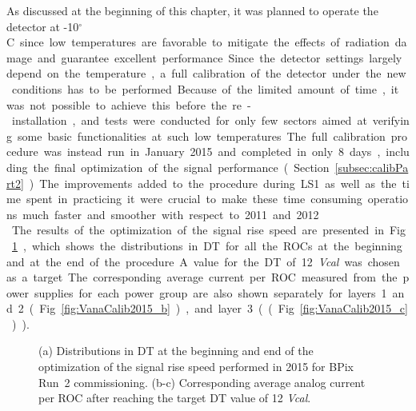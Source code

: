 As discussed at the beginning of this chapter, it was planned to operate the detector at -10\unit{$^\circ$C} since low temperatures
are favorable to mitigate the effects of radiation damage and guarantee excellent performance.
Since the detector settings largely depend on the temperature, a full calibration of the detector under the new conditions has to be performed.
Because of the limited amount of time, it was not possible to achieve this before the re-installation, and tests were conducted for only few sectors aimed at verifying some basic functionalities at such low temperatures.
The full calibration procedure was instead run in January 2015 and completed in only 8 days, including the final optimization of the signal performance (Section~\ref{subsec:calibPart2}).
The improvements added to the procedure during LS1 as well as the time spent in practicing it 
were crucial to make these time consuming operations much faster and smoother with respect to 2011 and 2012.\\

The results of the optimization of the signal rise speed are presented in Fig.~\ref{fig:VanaCalib2015}, which shows the 
distributions in DT for all the ROCs at the beginning and at the end of the procedure. A value for the DT of 12 \textit{Vcal} was chosen as a target.
The corresponding average current per ROC measured from the power supplies for each power group are also shown separately for layers 1 and 2 (Fig.~\ref{fig:VanaCalib2015_b}), and layer 3 ((Fig.~\ref{fig:VanaCalib2015_c})).

\begin{figure}[!htb]
 \begin{center}
 \end{center}
 \caption{(a) Distributions in DT at the beginning and end of the optimization of the signal rise speed performed in 2015 for BPix Run~2 commissioning. (b-c) Corresponding average analog current per ROC after reaching the target DT value of 12 \textit{Vcal}.}
 \label{fig:VanaCalib2015}
\end{figure}

